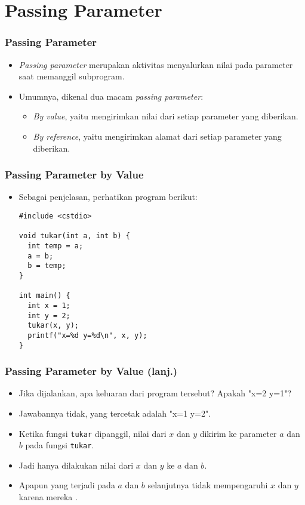 \section{Passing Parameter}
\frame{\sectionpage}

\begin{frame}
\frametitle{Passing Parameter}
\begin{itemize}
  \item \textit{Passing parameter} merupakan aktivitas menyalurkan nilai pada parameter saat memanggil subprogram.
  \item Umumnya, dikenal dua macam \textit{passing parameter}:
  \begin{itemize}
    \item \textit{By value}, yaitu mengirimkan \alert{nilai} dari setiap parameter yang diberikan.
    \item \textit{By reference}, yaitu mengirimkan \alert{alamat} dari setiap parameter yang diberikan.
  \end{itemize}
\end{itemize}
\end{frame}

\begin{frame}[fragile]
\frametitle{Passing Parameter by Value}
\begin{itemize}
  \item Sebagai penjelasan, perhatikan program berikut:
\begin{lstlisting}
#include <cstdio>

void tukar(int a, int b) {
  int temp = a;
  a = b;
  b = temp;
}

int main() {
  int x = 1;
  int y = 2;
  tukar(x, y);
  printf("x=%d y=%d\n", x, y);
}
\end{lstlisting}
\end{itemize}
\end{frame}

\begin{frame}[fragile]
\frametitle{Passing Parameter by Value (lanj.)}
\begin{itemize}
  \item Jika dijalankan, apa keluaran dari program tersebut? Apakah "x=2 y=1"?
  \item Jawabannya tidak, yang tercetak adalah "x=1 y=2".
  \item Ketika fungsi \texttt{tukar} dipanggil, nilai dari $x$ dan $y$ dikirim ke parameter $a$ dan $b$ pada fungsi \texttt{tukar}.
  \item Jadi hanya dilakukan  nilai dari $x$ dan $y$ ke $a$ dan $b$. \item Apapun yang terjadi pada $a$ dan $b$ selanjutnya tidak mempengaruhi $x$ dan $y$ karena mereka .
\end{itemize}
\end{frame}

